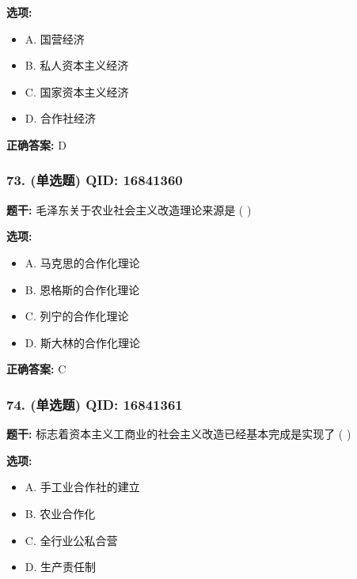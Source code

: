\documentclass[12pt,UTF8]{ctexart}
\begin{document}
\textbf{选项:}
\begin{itemize}[leftmargin=*]

  \item A. 国营经济

  \item B. 私人资本主义经济

  \item C. 国家资本主义经济

  \item D. 合作社经济

\end{itemize}

\textbf{正确答案:}
D

\vspace{0.3em}\hrulefill\vspace{0.7em}

\subsubsection*{73. (单选题) \small QID: 16841360}

\textbf{题干:}
毛泽东关于农业社会主义改造理论来源是 ( )

\textbf{选项:}
\begin{itemize}[leftmargin=*]

  \item A. 马克思的合作化理论

  \item B. 恩格斯的合作化理论

  \item C. 列宁的合作化理论

  \item D. 斯大林的合作化理论

\end{itemize}

\textbf{正确答案:}
C

\vspace{0.3em}\hrulefill\vspace{0.7em}

\subsubsection*{74. (单选题) \small QID: 16841361}

\textbf{题干:}
标志着资本主义工商业的社会主义改造已经基本完成是实现了 ( )

\textbf{选项:}
\begin{itemize}[leftmargin=*]

  \item A. 手工业合作社的建立

  \item B. 农业合作化

  \item C. 全行业公私合营

  \item D. 生产责任制

\end{itemize}
\end{document}
